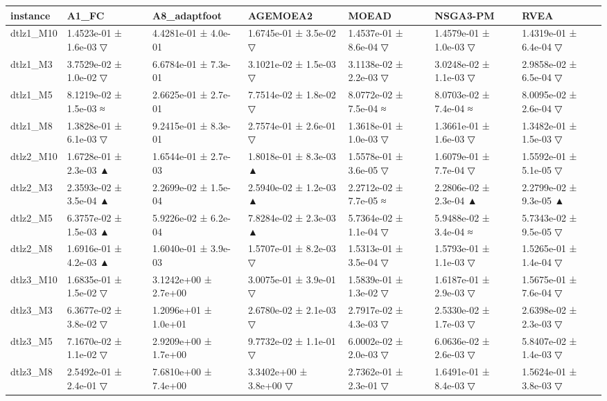 \begin{tabular}{lllllll}
\toprule
instance & A1\_FC & A8\_adaptfoot & AGEMOEA2 & MOEAD & NSGA3-PM & RVEA \\
\midrule
dtlz1\_M10 & 1.4523e-01 ± 1.6e-03 ▽ & 4.4281e-01 ± 4.0e-01 & 1.6745e-01 ± 3.5e-02 ▽ & 1.4537e-01 ± 8.6e-04 ▽ & 1.4579e-01 ± 1.0e-03 ▽ & 1.4319e-01 ± 6.4e-04 ▽ \\
dtlz1\_M3 & 3.7529e-02 ± 1.0e-02 ▽ & 6.6784e-01 ± 7.3e-01 & 3.1021e-02 ± 1.5e-03 ▽ & 3.1138e-02 ± 2.2e-03 ▽ & 3.0248e-02 ± 1.1e-03 ▽ & 2.9858e-02 ± 6.5e-04 ▽ \\
dtlz1\_M5 & 8.1219e-02 ± 1.5e-03 ≈ & 2.6625e-01 ± 2.7e-01 & 7.7514e-02 ± 1.8e-02 ▽ & 8.0772e-02 ± 7.5e-04 ≈ & 8.0703e-02 ± 7.4e-04 ≈ & 8.0095e-02 ± 2.6e-04 ▽ \\
dtlz1\_M8 & 1.3828e-01 ± 6.1e-03 ▽ & 9.2415e-01 ± 8.3e-01 & 2.7574e-01 ± 2.6e-01 ▽ & 1.3618e-01 ± 1.0e-03 ▽ & 1.3661e-01 ± 1.6e-03 ▽ & 1.3482e-01 ± 1.5e-03 ▽ \\
dtlz2\_M10 & 1.6728e-01 ± 2.3e-03 ▲ & 1.6544e-01 ± 2.7e-03 & 1.8018e-01 ± 8.3e-03 ▲ & 1.5578e-01 ± 3.6e-05 ▽ & 1.6079e-01 ± 7.7e-04 ▽ & 1.5592e-01 ± 5.1e-05 ▽ \\
dtlz2\_M3 & 2.3593e-02 ± 3.5e-04 ▲ & 2.2699e-02 ± 1.5e-04 & 2.5940e-02 ± 1.2e-03 ▲ & 2.2712e-02 ± 7.7e-05 ≈ & 2.2806e-02 ± 2.3e-04 ▲ & 2.2799e-02 ± 9.3e-05 ▲ \\
dtlz2\_M5 & 6.3757e-02 ± 1.5e-03 ▲ & 5.9226e-02 ± 6.2e-04 & 7.8284e-02 ± 2.3e-03 ▲ & 5.7364e-02 ± 1.1e-04 ▽ & 5.9488e-02 ± 3.4e-04 ≈ & 5.7343e-02 ± 9.5e-05 ▽ \\
dtlz2\_M8 & 1.6916e-01 ± 4.2e-03 ▲ & 1.6040e-01 ± 3.9e-03 & 1.5707e-01 ± 8.2e-03 ▽ & 1.5313e-01 ± 3.5e-04 ▽ & 1.5793e-01 ± 1.1e-03 ▽ & 1.5265e-01 ± 1.4e-04 ▽ \\
dtlz3\_M10 & 1.6835e-01 ± 1.5e-02 ▽ & 3.1242e+00 ± 2.7e+00 & 3.0075e-01 ± 3.9e-01 ▽ & 1.5839e-01 ± 1.3e-02 ▽ & 1.6187e-01 ± 2.9e-03 ▽ & 1.5675e-01 ± 7.6e-04 ▽ \\
dtlz3\_M3 & 6.3677e-02 ± 3.8e-02 ▽ & 1.2096e+01 ± 1.0e+01 & 2.6780e-02 ± 2.1e-03 ▽ & 2.7917e-02 ± 4.3e-03 ▽ & 2.5330e-02 ± 1.7e-03 ▽ & 2.6398e-02 ± 2.3e-03 ▽ \\
dtlz3\_M5 & 7.1670e-02 ± 1.1e-02 ▽ & 2.9209e+00 ± 1.7e+00 & 9.7732e-02 ± 1.1e-01 ▽ & 6.0002e-02 ± 2.0e-03 ▽ & 6.0636e-02 ± 2.6e-03 ▽ & 5.8407e-02 ± 1.4e-03 ▽ \\
dtlz3\_M8 & 2.5492e-01 ± 2.4e-01 ▽ & 7.6810e+00 ± 7.4e+00 & 3.3402e+00 ± 3.8e+00 ▽ & 2.7362e-01 ± 2.3e-01 ▽ & 1.6491e-01 ± 8.4e-03 ▽ & 1.5624e-01 ± 3.8e-03 ▽ \\

\end{tabular}
